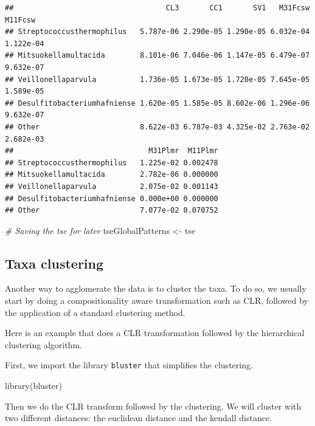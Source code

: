 \documentclass[
]{book}
\newenvironment{Shaded}{\begin{snugshade}}{\end{snugshade}}
\newcommand{\CommentTok}[1]{\textcolor[rgb]{0.56,0.35,0.01}{\textit{#1}}}
\newcommand{\FunctionTok}[1]{\textcolor[rgb]{0.00,0.00,0.00}{#1}}
\newcommand{\NormalTok}[1]{#1}
\newcommand{\OtherTok}[1]{\textcolor[rgb]{0.56,0.35,0.01}{#1}}
\begin{document}
\begin{verbatim}
##                                   CL3       CC1       SV1   M31Fcsw   M11Fcsw
## Streptococcusthermophilus   5.787e-06 2.290e-05 1.290e-05 6.032e-04 1.122e-04
## Mitsuokellamultacida        8.101e-06 7.046e-06 1.147e-05 6.479e-07 9.632e-07
## Veillonellaparvula          1.736e-05 1.673e-05 1.720e-05 7.645e-05 1.589e-05
## Desulfitobacteriumhafniense 1.620e-05 1.585e-05 8.602e-06 1.296e-06 9.632e-07
## Other                       8.622e-03 6.787e-03 4.325e-02 2.763e-02 2.682e-03
##                               M31Plmr  M11Plmr
## Streptococcusthermophilus   1.225e-02 0.002478
## Mitsuokellamultacida        2.782e-06 0.000000
## Veillonellaparvula          2.075e-02 0.001143
## Desulfitobacteriumhafniense 0.000e+00 0.000000
## Other                       7.077e-02 0.070752
\end{verbatim}

\begin{Shaded}
\begin{Highlighting}[]
\CommentTok{\# Saving the tse for later}
\NormalTok{tseGlobalPatterns }\OtherTok{\textless{}{-}}\NormalTok{ tse}
\end{Highlighting}
\end{Shaded}

\hypertarget{taxa-clustering}{%
\subsection{Taxa clustering}\label{taxa-clustering}}

Another way to agglomerate the data is to cluster the taxa. To do so,
we usually start by doing a compositionality aware transformation such as CLR,
followed by the application of a standard clustering method.

Here is an example that does a CLR transformation followed by the hierarchical
clustering algorithm.

First, we import the library \texttt{bluster} that simplifies the clustering.

\begin{Shaded}
\begin{Highlighting}[]
\FunctionTok{library}\NormalTok{(bluster)}
\end{Highlighting}
\end{Shaded}

Then we do the CLR transform followed by the clustering. We will cluster with
two different distances: the euclidean distance and the kendall distance.
\end{document}
